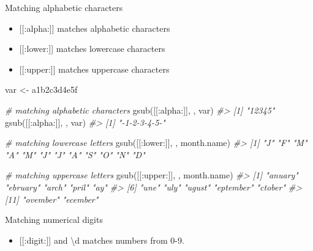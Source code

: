 \documentclass[
]{book}
\newenvironment{Shaded}{\begin{snugshade}}{\end{snugshade}}
\newcommand{\CommentTok}[1]{\textcolor[rgb]{0.56,0.35,0.01}{\textit{#1}}}
\newcommand{\FunctionTok}[1]{\textcolor[rgb]{0.00,0.00,0.00}{#1}}
\newcommand{\NormalTok}[1]{#1}
\newcommand{\OtherTok}[1]{\textcolor[rgb]{0.56,0.35,0.01}{#1}}
\newcommand{\StringTok}[1]{\textcolor[rgb]{0.31,0.60,0.02}{#1}}
\providecommand{\tightlist}{%
  \setlength{\itemsep}{0pt}\setlength{\parskip}{0pt}}
\begin{document}
Matching alphabetic characters

\begin{itemize}
\tightlist
\item
  {[}{[}:alpha:{]}{]} matches alphabetic characters
\item
  {[}{[}:lower:{]}{]} matches lowercase characters
\item
  {[}{[}:upper:{]}{]} matches uppercase characters
\end{itemize}

\begin{Shaded}
\begin{Highlighting}[]
\NormalTok{var }\OtherTok{\textless{}{-}} \StringTok{\textquotesingle{}a1b2c3d4e5f\textquotesingle{}}

\CommentTok{\# matching alphabetic characters}
\FunctionTok{gsub}\NormalTok{(}\StringTok{\textquotesingle{}[[:alpha:]]\textquotesingle{}}\NormalTok{, }\StringTok{\textquotesingle{}\textquotesingle{}}\NormalTok{, var)}
\CommentTok{\#\textgreater{} [1] "12345"}
\FunctionTok{gsub}\NormalTok{(}\StringTok{\textquotesingle{}[[:alpha:]]\textquotesingle{}}\NormalTok{, }\StringTok{\textquotesingle{}{-}\textquotesingle{}}\NormalTok{, var)}
\CommentTok{\#\textgreater{} [1] "{-}1{-}2{-}3{-}4{-}5{-}"}

\CommentTok{\# matching lowercase letters}
\FunctionTok{gsub}\NormalTok{(}\StringTok{\textquotesingle{}[[:lower:]]\textquotesingle{}}\NormalTok{, }\StringTok{\textquotesingle{}\textquotesingle{}}\NormalTok{, month.name)}
\CommentTok{\#\textgreater{}  [1] "J" "F" "M" "A" "M" "J" "J" "A" "S" "O" "N" "D"}

\CommentTok{\# matching uppercase letters}
\FunctionTok{gsub}\NormalTok{(}\StringTok{\textquotesingle{}[[:upper:]]\textquotesingle{}}\NormalTok{, }\StringTok{\textquotesingle{}\textquotesingle{}}\NormalTok{, month.name)}
\CommentTok{\#\textgreater{}  [1] "anuary"   "ebruary"  "arch"     "pril"     "ay"      }
\CommentTok{\#\textgreater{}  [6] "une"      "uly"      "ugust"    "eptember" "ctober"  }
\CommentTok{\#\textgreater{} [11] "ovember"  "ecember"}
\end{Highlighting}
\end{Shaded}

Matching numerical digits

\begin{itemize}
\tightlist
\item
  {[}{[}:digit:{]}{]} and \textbackslash d matches numbers from 0-9.
\end{itemize}
\end{document}

